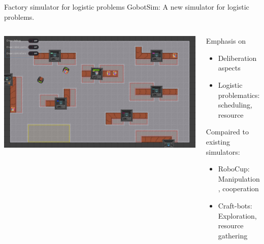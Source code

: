 \begin{frame}{Factory simulator for logistic problems}
    GobotSim: A new simulator for logistic problems.
    \begin{columns}
        \begin{column}{0.5\textwidth}
            \includegraphics[width=\linewidth]{images/gobot-rae.png}
        \end{column}
        \begin{column}{0.5\textwidth}
            Emphasis on
            \begin{itemize}
                \item Deliberation aspects
                \item Logistic problematics: scheduling, resource
            \end{itemize}
            Compaired to existing simulators:
            \begin{itemize}
                \item RoboCup: Manipulation, cooperation
                \item Craft-bots: Exploration, resource gathering
            \end{itemize}
        \end{column}
    \end{columns}
\end{frame}

